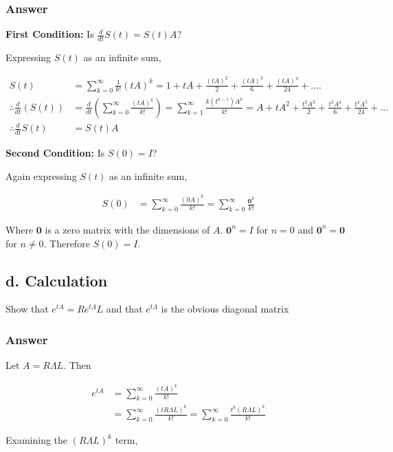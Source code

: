 \documentclass{article}
\newcommand{\n}{\newline}
\begin{document}
		\subsubsection{Answer}
		
		\textbf{First Condition:} Is $\frac{d}{dt}S(t)=S(t)A$?\n
		
		Expressing $S(t)$ as an infinite sum,
		
		\begin{align*}
			S(t)&=\sum_{k=0}^{\infty}\frac{1}{k!}(tA)^{k}=1+tA+\frac{(tA)^2}{2}+\frac{(tA)^3}{6}+\frac{(tA)^4}{24}+.... \\
			\therefore \frac{d}{dt}(S(t))&=\frac{d}{dt}(\sum_{k=0}^{\infty}\frac{(tA)^{k}}{k!})=\sum_{k=1}^{\infty}\frac{k(t^{k-1})A^k}{k!}=A+tA^2+\frac{t^2A^3}{2}+\frac{t^3A^4}{6}+\frac{t^4A^5}{24}+...\\
			\therefore \frac{d}{dt}S(t)&=S(t)A
		\end{align*}
		
		\textbf{Second Condition:} Is $S(0)=I$?\n
		
		Again expressing $S(t)$ as an infinite sum,
		
		\begin{align*}
			S(0)&=\sum_{k=0}^{\infty}\frac{(0A)^k}{k!}=\sum_{k=0}^{\infty}\frac{\mathbf{0}^k}{k!}
		\end{align*}
		
		Where $\mathbf{0}$ is a zero matrix with the dimensions of $A$.  $\mathbf{0}^n=I$ for $n=0$ and $\mathbf{0}^n=\mathbf{0}$ for $n\neq0$.  Therefore $S(0)=I$.
		
		
		\subsection{d. Calculation}
		Show that $e^{tA}=Re^{t\Lambda}L$ and that $e^{t\Lambda}$ is the obvious diagonal matrix
		\subsubsection{Answer}
		
		Let $A=R\Lambda L$.  Then
		
		\begin{align*}
			e^{tA}&=\sum_{k=0}^{\infty}\frac{(tA)^k}{k!}\\
			&=\sum_{k=0}^{\infty}\frac{(tR\Lambda L)^k}{k!}=\sum_{k=0}^{\infty}\frac{t^k(R\Lambda L)^k}{k!}
		\end{align*}
		
		Examining the $(R\Lambda L)^k$ term,
		
\end{document}
